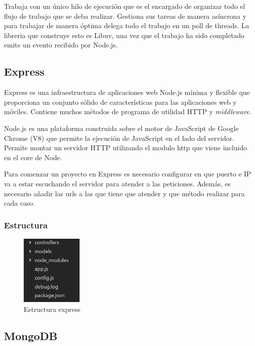\documentclass[a4paper, 12pt]{book}
\begin{document}
Trabaja con un \'unico hilo de ejecuci\'on que es el encargado de organizar todo el flujo de
trabajo que se deba realizar. Gestiona sus tareas de manera as\'incrona y para trabajar de manera
\'optima delega todo el trabajo en un poll de threads. La libreria que construye esto es Libuv, una
vez que el trabajo ha sido completado emite un evento recibido por Node.js.



\subsection{Express}
\label{subsec:express}

Express\cite{Express} es una infraestructura de aplicaciones web Node.js m\'inima y flexible que proporciona
un conjunto s\'olido de caracter\'isticas para las aplicaciones web y m\'oviles. Contiene muchos
m\'etodos de programa de utilidad HTTP y \emph{middleware}.

Node.js es una plataforma construida sobre el motor de JavaScript de Google Chrome (V8)
que permite la ejecuci\'on de JavaScript en el lado del servidor. Permite montar un servidor HTTP
utilizando el modulo http que viene incluido en el core de Node.

Para comenzar un proyecto en Express es necesario configurar en que puerto e IP va a estar
escuchando el servidor para atender a las peticiones. Adem\'as, es necesario a\~nadir las urls a las
que tiene que atender y que m\'etodo realizar para cada caso.

\subsubsection{Estructura}
\label{subsec:estilo}

\begin{figure}[H]
  \centering
  \includegraphics[width=3cm, keepaspectratio]{img/estructura_express}
  \caption{Estructura express}
  \label{figura:estructura_express}
\end{figure}


\subsection{MongoDB}
\label{subsec:estilo}
\end{document}
